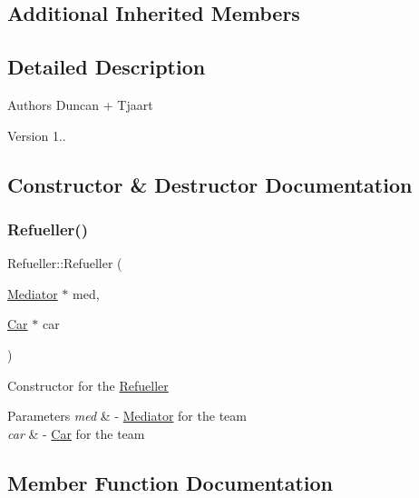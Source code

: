 \subsection*{Additional Inherited Members}


\subsection{Detailed Description}
\begin{DoxyAuthor}{Authors}
Duncan + Tjaart 
\end{DoxyAuthor}
\begin{DoxyVersion}{Version}
1.. 
\end{DoxyVersion}


\subsection{Constructor \& Destructor Documentation}
\mbox{\label{class_refueller_aa9bba16400033baf27cd554c58021ddc}} 
\subsubsection{\texorpdfstring{Refueller()}{Refueller()}}
{\footnotesize\ttfamily Refueller\+::\+Refueller (\begin{DoxyParamCaption}\item[{\mbox{\hyperlink{class_mediator}{Mediator}} $\ast$}]{med,  }\item[{\mbox{\hyperlink{class_car}{Car}} $\ast$}]{car }\end{DoxyParamCaption})\hspace{0.3cm}{\ttfamily [inline]}}

Constructor for the \mbox{\hyperlink{class_refueller}{Refueller}} 
\begin{DoxyParams}{Parameters}
{\em med} & -\/ \mbox{\hyperlink{class_mediator}{Mediator}} for the team \\
\hline
{\em car} & -\/ \mbox{\hyperlink{class_car}{Car}} for the team \\
\hline
\end{DoxyParams}


\subsection{Member Function Documentation}
\mbox{\label{class_refueller_a60e223f847141196f4b44656869b06d1}} 
